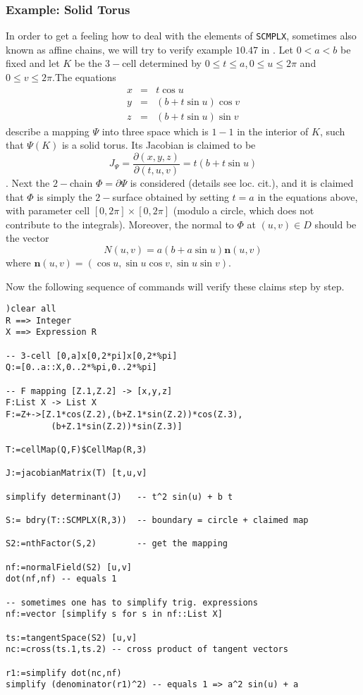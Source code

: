 \documentclass[12pt,a4paper]{article}
\begin{document}
\subsubsection{Example: Solid Torus}
In order to get a feeling how to deal with the elements of {\tt SCMPLX},
sometimes also known as affine chains, we will try to verify example
$10.47$ in \cite{PMA}.
Let $0<a<b$ be fixed and let $K$ be the $3-$cell determined by 
$0\leq t\leq a$,\,$0\leq u\leq 2\pi$ and $0\leq v\leq 2\pi$.The
equations
\begin{eqnarray*}
x &=& t \cos u \\
y &=& (b+t \sin u) \cos v \\
z &=& (b+t \sin u) \sin v
\end{eqnarray*}
describe a mapping $\Psi$ into three space which is $1-1$ in the interior
of $K$, such that $\Psi(K)$ is a solid torus. Its Jacobian is claimed to
be
\begin{displaymath}
  J_\Psi = \frac{\partial(x,y,z)}{\partial(t,u,v)}=t(b+t\sin u)
\end{displaymath}.
Next the $2-$chain $\Phi=\partial\Psi$ is considered (details see loc. cit.),
and it is claimed that $\Phi$ is simply the $2-$surface obtained by setting
$t=a$ in the equations above, with parameter cell $[0,2\pi]\times[0,2\pi]$
(modulo a circle, which does not contribute to the integrals).
Moreover, the normal to $\Phi$ at $(u,v)\in D$ should be the vector
\begin{displaymath}
   N(u,v) = a(b+a\sin u) \mathbf{n}(u,v)
\end{displaymath}
where $\mathbf{n}(u,v)=(\cos u, \sin u \cos v, \sin u \sin v)$.

Now the following sequence of commands will verify these claims
step by step.
\begin{lstlisting}
)clear all
R ==> Integer
X ==> Expression R

-- 3-cell [0,a]x[0,2*pi]x[0,2*%pi]
Q:=[0..a::X,0..2*%pi,0..2*%pi]

-- F mapping [Z.1,Z.2] -> [x,y,z]
F:List X -> List X
F:=Z+->[Z.1*cos(Z.2),(b+Z.1*sin(Z.2))*cos(Z.3),
         (b+Z.1*sin(Z.2))*sin(Z.3)]

T:=cellMap(Q,F)$CellMap(R,3)

J:=jacobianMatrix(T) [t,u,v]

simplify determinant(J)   -- t^2 sin(u) + b t

S:= bdry(T::SCMPLX(R,3))  -- boundary = circle + claimed map

S2:=nthFactor(S,2)        -- get the mapping

nf:=normalField(S2) [u,v]  
dot(nf,nf) -- equals 1

-- sometimes one has to simplify trig. expressions
nf:=vector [simplify s for s in nf::List X]

ts:=tangentSpace(S2) [u,v]
nc:=cross(ts.1,ts.2) -- cross product of tangent vectors

r1:=simplify dot(nc,nf)
simplify (denominator(r1)^2) -- equals 1 => a^2 sin(u) + a 
\end{lstlisting}
%
\end{document}
